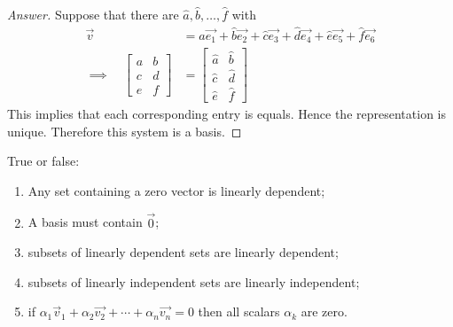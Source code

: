 \begin{proof}[Answer]
  Suppose that there are $\hat{a},\hat{b},\dots,\hat{f}$ with
  \begin{align*}
    \vec{v}&=\hat{a}\vec{e_1}+\hat{b}\vec{e_2}+\hat{c}\vec{e_3}
              +\hat{d}\vec{e_4}+\hat{e}\vec{e_5}+\hat{f}\vec{e_6}\\
    \implies\quad 
    \begin{bmatrix} 
      a&b\\c&d\\e&f 
    \end{bmatrix}
    &=
    \begin{bmatrix} 
      \hat{a} & \hat{b}\\ \hat{c}&\hat{d} \\ \hat{e}&\hat{f}
    \end{bmatrix}
  \end{align*}
  This implies that each corresponding entry is equals. Hence the representation
  is unique. Therefore this system is a basis.




\end{proof}
\begin{exercise}
  True or false:
  \begin{enumerate}
    \item Any set containing a zero vector is linearly dependent;
    \item A basis must contain $\vec{0}$;
    \item subsets of linearly dependent sets are linearly dependent;
    \item subsets of linearly independent sets are linearly independent;
    \item if $\alpha_1\vec{v}_1+\alpha_2\vec{v_2}+\cdots+\alpha_n\vec{v_n}=0$
      then all scalars $\alpha_k$ are zero.
  \end{enumerate}
\end{exercise}
